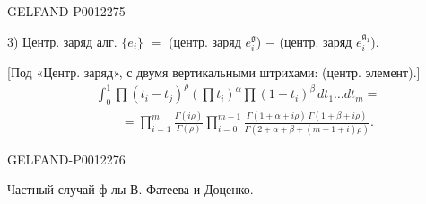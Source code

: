 \begin{GelfandAdjacentEvidence}{GELFAND-P001227}{5}


3) Центр. заряд алг. \(\{e_i\}\) \(=\)
(центр. заряд \(e_i^{\mathfrak g}\)) \(-\) (центр. заряд \(e_i^{\mathfrak g_1}\)).

[Под «Центр. заряд», с двумя вертикальными штрихами: (центр. элемент).]
\begin{equation*}
\begin{aligned}
&\int_0^1\prod(t_i-t_j)^\rho
\left(\prod t_i\right)^\alpha\prod(1-t_i)^\beta\,dt_1\ldots dt_m=\\
&\qquad=\prod_{i=1}^{m}\frac{\Gamma(i\rho)}{\Gamma(\rho)}
\prod_{i=0}^{m-1}\frac{\Gamma(1+\alpha+i\rho)\,\Gamma(1+\beta+i\rho)}
{\Gamma(2+\alpha+\beta+(m-1+i)\rho)}.
\end{aligned}\tag{17}
\end{equation*}
\end{GelfandAdjacentEvidence}
\begin{GelfandAdjacentEvidence}{GELFAND-P001227}{6}

\end{GelfandAdjacentEvidence}


Частный случай ф-лы В. Фатеева и Доценко.


